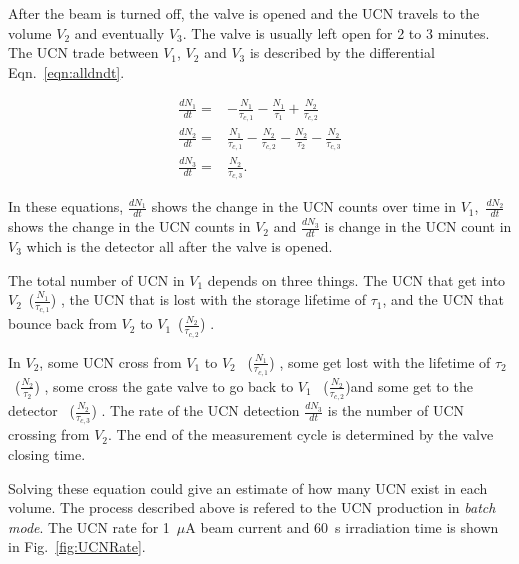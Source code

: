 After the beam is turned off, the valve is opened and the UCN travels
to the volume $V_2$ and eventually $V_3$. The valve is usually left
open for 2 to 3 minutes. The UCN trade between $V_1$, $V_2$ and $V_3$
is described by the differential Eqn.~\ref{eqn:alldndt}.

\begin{equation}
  \label{eqn:alldndt}
  \begin{aligned}
    \frac{dN_1}{dt} =&- \frac{N_1}{\tau_{c,1}} - \frac{N_1}{\tau_1} + \frac{N_2}{\tau_{c,2}}  \\
    \frac{dN_2}{dt} =& \frac{N_1}{\tau_{c,1}} - \frac{N_2}{\tau_{c,2}} - \frac{N_2}{\tau_2} - \frac{N_2}{\tau_{c,3}} \\
    \frac{dN_3}{dt} =& \frac{N_2}{\tau_{c,3}}.
  \end{aligned}
\end{equation}


In these equations, \large $\frac{dN_1}{dt}$ \normalsize shows the
change in the UCN counts over time in $V_1$,~\large $\frac{dN_2}{dt}$
\normalsize shows the change in the UCN counts in $V_2$ and \large
$\frac{dN_3}{dt}$ \normalsize is change in the UCN count in $V_3$
which is the detector all after the valve is opened.

The total number of UCN in $V_1$ depends on three things. The UCN that
get into $V_2$~\large($\frac{N_1}{\tau_{c,1}}$) \normalsize, the UCN that is lost
with the storage lifetime of $\tau_1$, and the UCN that bounce back from
$V_2$ to $V_1$~\large ($\frac{N_2}{\tau_{c,2}}$) \normalsize.

In $V_2$, some UCN cross from $V_1$ to $V_2$~ \large
($\frac{N_1}{\tau_{c,1}}$) \normalsize, some get lost with the
lifetime of $\tau_2$~\large ($\frac{N_2}{\tau_2}$) \normalsize, some
cross the gate valve to go back to $V_1$~ \large
($\frac{N_2}{\tau_{c,2}}$)\normalsize and some get to the detector
~\large ($\frac{N_2}{\tau_{c,3}}$) \normalsize. The rate of the UCN
detection $\frac{dN_3}{dt}$ is the number of UCN crossing from $V_2$.
The end of the measurement cycle is determined by the valve closing
time.

Solving these equation could give an estimate of how many UCN exist in
each volume. The process described above is refered to the UCN
production in {\it {batch mode}}. The UCN rate for 1~$\mu$A beam current
and 60~s irradiation time is shown in Fig.~\ref{fig:UCNRate}.


